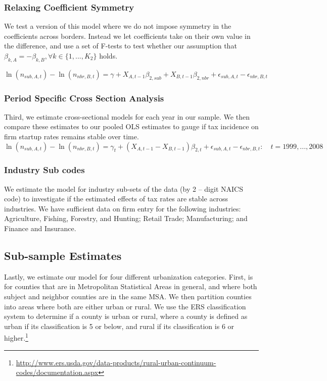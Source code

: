 \documentclass[12pt,a4paper]{article}
\begin{document}
\subsubsection{Relaxing Coefficient Symmetry}
We test a version of this model where we do not impose symmetry in the coefficients across borders. Instead we let coefficients take on their own value in the difference, and use a set of F-tests to test whether our assumption that $\beta_{k,A} = - \beta_{k,B}, \forall k \in \{1,...,K_{2}\}$ holds. 

\begin{equation}\label{sense1}
\ln(n_{sub,A,t})-\ln(n_{nbr,B,t}) = \gamma + X_{A,t-1}\beta_{2,sub}+X_{B,t-1}\beta_{2,nbr}+ \epsilon_{sub,A,t}-\epsilon_{nbr,B,t} 
\end{equation}

\subsubsection{Period Specific Cross Section Analysis}
Third, we estimate cross-sectional models for each year in our sample. We then compare these estimates to our pooled OLS estimates to gauge if tax incidence on firm startup rates remains stable over time.
\begin{equation}\label{sense2}
\ln(n_{sub,A,t})-\ln(n_{nbr,B,t})  = \gamma_{t}+(X_{A,t-1}-X_{B,t-1})\beta_{2,t}+ \epsilon_{sub,A,t}-\epsilon_{nbr,B,t}: \quad t = 1999,...,2008
\end{equation}


\subsubsection{Industry Sub codes}

We estimate the model for industry sub-sets of the data (by 2 – digit NAICS code) to investigate if the estimated effects of tax rates are stable across industries.  We have sufficient data on firm entry for the following industries: Agriculture, Fishing, Forestry, and Hunting; Retail Trade; Manufacturing; and Finance and Insurance.

\subsection{Sub-sample Estimates}

Lastly, we estimate our model for four different urbanization categories. First, is for counties that are in Metropolitan Statistical Areas in general, and where both subject and neighbor counties are in the same MSA. We then partition counties into areas where both are  either urban or rural. We use the ERS classification system to determine if a county is urban or rural, where a county is defined as urban if its classification is 5 or below, and rural if its classification is 6 or higher.\footnote{\url{http://www.ers.usda.gov/data-products/rural-urban-continuum-codes/documentation.aspx}}
\end{document}
